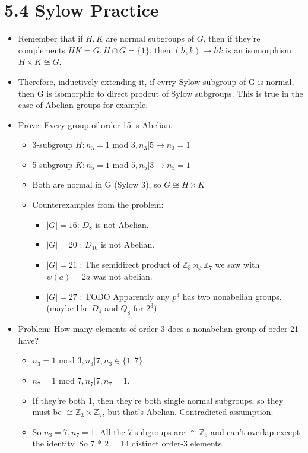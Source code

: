 \documentclass[11pt, oneside]{article}   	%
\begin{document}
\section{5.4 Sylow Practice}
\begin{itemize}
\item Remember that if $H, K$ are normal subgroups of $G$, then if they're complements $HK = G, H \cap G = \{1\}$, then $(h, k) \rightarrow hk$ is an isomorphism $H \times K \cong G$.
\item Therefore, inductively extending it, if evrry Sylow subgroup of G is normal, then G is isomorphic to direct prodcut of Sylow subgroups.  This is true in the case of Abelian groups for example.

\item Prove: Every group of order 15 is Abelian.
\begin{itemize}
\item 3-subgroup $H: n_3 = 1 $ mod $ 3, n_3 | 5 \rightarrow n_3 = 1$
\item 5-subgroup $K: n_5 = 1 $ mod $ 5, n_5 | 3 \rightarrow n_5 = 1$
\item Both are normal in G (Sylow 3), so $G \cong H \times K$
\item Counterexamples from the problem: 
\begin{itemize}
\item $|G| = 16$: $D_{8}$ is not Abelian.
\item $|G| = 20$ : $D_{10}$ is not Abelian.
\item $|G| = 21$ : The semidirect product of $\mathbb{Z}_3 \rtimes_{\psi} \mathbb{Z}_7$ we saw with $\psi(a) = 2a$ was not abelian.
\item $|G| = 27$ : TODO Apparently any $p^3$ has two nonabelian groups. (maybe like $D_4$ and $Q_8$ for $2^3$)
\end{itemize}
\end{itemize}

\item Problem: How many elements of order 3 does a nonabelian group of order 21 have?
\begin{itemize}
\item $n_3 = 1 $ mod $  3, n_3 | 7, n_3 \in \{1, 7\}$.
\item $n_7 = 1 $ mod $ 7, n_7 | 7, n_7 = 1$.
\item If they're both 1, then they're both single normal subgroups, so they must be $\cong \mathbb{Z}_3 \times \mathbb{Z}_7$, but that's Abelian.  Contradicted assumption.
\item So $n_3 = 7, n_7 = 1$.  All the 7 subgroups are $\cong  \mathbb{Z}_3$ and can't overlap except the identity.  So 7 * 2 = 14 distinct order-3 elements.
\end{itemize}


\end{itemize}
\end{document}
